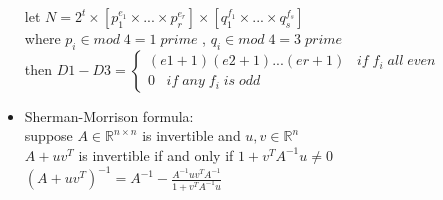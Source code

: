 \begin{itemize}
  let $N=2^t \times [p_1^{e_1} \times ...\times p_r^{e_r}] \times [q_1^{f_1} \times ...\times q_s^{f_s}]$\\
  where $p_i \in mod\;4 = 1\;prime$ , $q_i \in mod\;4 = 3\;prime$\\
  then $D1 - D3 = \begin{cases}(e1+1)(e2+1)...(er+1)\;\;\;if\;f_i\;all\;even\\0\;\;\;if\;any\;f_i\;is\;odd\end{cases}$
\item Sherman-Morrison formula:\\
  suppose $A \in \mathbb{R}^{n\times n}$ is invertible and $u,v \in \mathbb{R}^n$\\
  $A + uv^T$ is invertible if and only if $1 + v^TA^{-1}u \ne 0$\\
  $(A + uv^T)^{-1} = A^{-1} - \frac{A^{-1}uv^TA^{-1}}{1+v^TA^{-1}u}$\\
\end{itemize}
